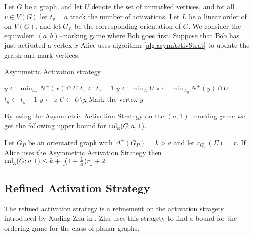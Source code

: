 \begin{definition} 
    Let $G$ be a graph, and let $U$ denote the set of unmarked vertices, and for all $v\in V(G)$ let $t_v=a$ track the number of activations. Let $L$ be a linear order of on $V(G)$, and let $G_L$ be the corresponding orientation of $G$.    
    We consider the equivalent $(a,b)$--marking game where Bob goes first. Suppose that Bob has just activated a vertex $x$ Alice uses algorithm \ref{alg:asymActivStrat} to update the graph and mark vertices.
    
    \begin{algorithm}[h]
        \caption{Asymmetric Activation strategy}
        \label{alg:asymActivStrat}
        \begin{algorithmic}[1]
            \Statex
                    \State $y\gets \min_{L_x} N^+(x)\cap U$
                    \State $t_x \gets t_x-1$
                    \Else 
                    \State $y\gets \min_L U$                  
                \EndIf
                    \State $z\gets \min_{L_y} N^+(y)\cap U$
                    \State $t_y \gets t_y-1$
                    \State $y\gets z$
                \EndWhile
                \State $U \gets U \setminus y$
                \State Mark the vertex $y$
            \EndFor
        \end{algorithmic}
    \end{algorithm}
    
    By using the Asymmetric Activation Strategy on the $(a,1)$--marking game we get the following upper bound for $\operatorname{col_g}(G;a,1)$.

    \begin{theorem}  
        Let $G_P$ be an orientated graph with $\Delta^+(G_P)=k>a$ and let $r_{G_L}(\Sigma)=r$. If Alice uses the Asymmetric Activation Strategy then $\operatorname{col_g}(G;a,1)\leq k+\left\lfloor (1+\frac{1}{a})r \right\rfloor +2$
    \end{theorem}

\end{definition}



\subsection{Refined Activation Strategy}
The refined activation strategy is a refinement on the activation stragety introduced by Xuding Zhu in \cite{Zhu2008}. Zhu uses this stragety to find a bound for the ordering game for the class of planar graphs. 

